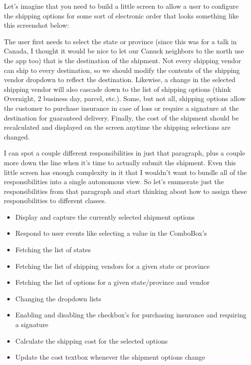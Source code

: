 \documentclass{article}
\begin{document}
{Let's imagine that you need to build a little screen to allow a user to configure the shipping options for some sort of electronic order that looks something like this screenshot below:

The user first needs to select the state or province (since this was for a talk in Canada, I thought it would be nice to let our Canuck neighbors to the north use the app too) that is the destination of the shipment.  Not every shipping vendor can ship to every destination, so we should modify the contents of the shipping vendor dropdown to reflect the destination.  Likewise, a change in the selected shipping vendor will also cascade down to the list of shipping options (think Overnight, 2 business day, parcel, etc.).  Some, but not all, shipping options allow the customer to purchase insurance in case of loss or require a signature at the destination for guaranteed delivery.  Finally, the cost of the shipment should be recalculated and displayed on the screen anytime the shipping selections are changed.

I can spot a couple different responsibilities in just that paragraph, plus a couple more down the line when it's time to actually submit the shipment.  Even this little screen has enough complexity in it that I wouldn't want to bundle all of the responsibilities into a single autonomous view.  So let's enumerate just the responsibilities from that paragraph and start thinking about how to assign these responsibilities to different classes.

 \begin{itemize}
 \item  Display and capture the currently selected shipment options  \vspace{5pt}
 \item  Respond to user events like selecting a value in the ComboBox's  \vspace{5pt}
 \item  Fetching the list of states  \vspace{5pt}
 \item  Fetching the list of shipping vendors for a given state or province  \vspace{5pt}
 \item  Fetching the list of options for a given state/province and vendor  \vspace{5pt}
 \item  Changing the dropdown lists  \vspace{5pt}
 \item  Enabling and disabling the checkbox's for purchasing insurance and requiring a signature  \vspace{5pt}
 \item  Calculate the shipping cost for the selected options  \vspace{5pt}
 \item  Update the cost textbox whenever the shipment options change  \vspace{5pt}
  \end{itemize}

}
\end{document}
